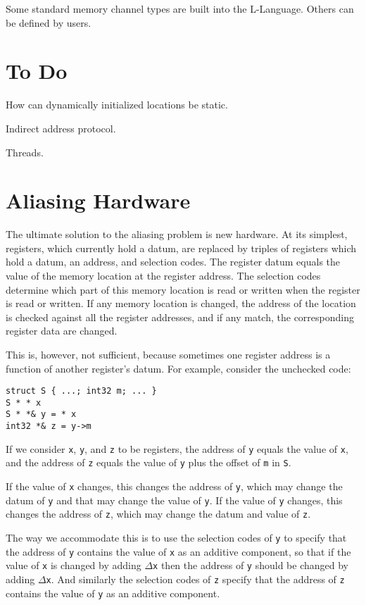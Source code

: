 \documentclass[12pt]{article}
\newenvironment{indpar}[1][0.3in]%
	{\begin{list}{}%
		     {\setlength{\itemsep}{0in}%
		      \setlength{\topsep}{0in}%
		      \setlength{\parsep}{1ex}%
		      \setlength{\labelwidth}{#1}%
		      \setlength{\leftmargin}{#1}%
		      \addtolength{\leftmargin}{\labelsep}}%
	 \item}%
	{\end{list}}
\begin{document}
Some standard memory channel types are built into the L-Language.
Others can be defined by users.

\section{To Do}

How can dynamically initialized locations be static.

Indirect address protocol.
\label{INDIRECT-ADDRESS-PROTOCOL}

Threads.
\label{THREADS}

\appendix

\section{Aliasing Hardware}
\label{ALIASING-HARDWARE}

The ultimate solution to the aliasing problem is new hardware.
At its simplest, registers, which currently hold a datum,
are replaced by triples of registers which hold a datum,
an address, and selection codes.  The register datum equals the value
of the memory location at the register address.  The selection
codes determine which part of this memory location is read or written
when the register is read or written.  If any memory location is
changed, the address of the location is checked against all the
register addresses, and if any match, the corresponding register
data are changed.

This is, however, not sufficient, because sometimes one register
address is a function of another register's datum.  For example,
consider the unchecked code:
\begin{indpar}[0.5em]\begin{verbatim}
struct S { ...; int32 m; ... }
S * * x
S * *& y = * x
int32 *& z = y->m
\end{verbatim}\end{indpar}
If we consider {\tt x}, {\tt y}, and {\tt z} to be registers,
the address of {\tt y} equals the value of {\tt x}, and the
address of {\tt z} equals the value of {\tt y} plus the offset of
{\tt m} in {\tt S}.

If the value of {\tt x} changes, this changes the address of {\tt y},
which may change the datum of {\tt y} and that may change the value
of {\tt y}.  If the value of {\tt y} changes, this changes the address
of {\tt z}, which may change the datum and value of {\tt z}.

The way we accommodate this is to use the selection codes of {\tt y}
to specify that the address of {\tt y} contains the value of {\tt x}
as an additive component, so
that if the value of {\tt x} is changed by adding $\Delta${\tt x}
then the address of {\tt y} should be changed by adding $\Delta${\tt x}.
And similarly the selection codes
of {\tt z} specify that the address of {\tt z}
contains the value of {\tt y} as an additive component.
\end{document}

